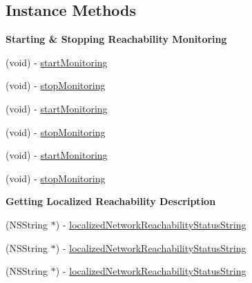 \subsection*{Instance Methods}
\begin{Indent}\textbf{ Starting \& Stopping Reachability Monitoring}\par
{\em 

 

 }\begin{DoxyCompactItemize}
\item 
(void) -\/ \mbox{\hyperlink{interface_a_f_network_reachability_manager_aa455bdcd0711021421aef6e2f87f62d7}{start\+Monitoring}}
\item 
(void) -\/ \mbox{\hyperlink{interface_a_f_network_reachability_manager_a3494d1eb9e2537cbd828e3632fc8e6ca}{stop\+Monitoring}}
\item 
(void) -\/ \mbox{\hyperlink{interface_a_f_network_reachability_manager_aa455bdcd0711021421aef6e2f87f62d7}{start\+Monitoring}}
\item 
(void) -\/ \mbox{\hyperlink{interface_a_f_network_reachability_manager_a3494d1eb9e2537cbd828e3632fc8e6ca}{stop\+Monitoring}}
\item 
(void) -\/ \mbox{\hyperlink{interface_a_f_network_reachability_manager_aa455bdcd0711021421aef6e2f87f62d7}{start\+Monitoring}}
\item 
(void) -\/ \mbox{\hyperlink{interface_a_f_network_reachability_manager_a3494d1eb9e2537cbd828e3632fc8e6ca}{stop\+Monitoring}}
\end{DoxyCompactItemize}
\end{Indent}
\begin{Indent}\textbf{ Getting Localized Reachability Description}\par
{\em 

 

 }\begin{DoxyCompactItemize}
\item 
(N\+S\+String $\ast$) -\/ \mbox{\hyperlink{interface_a_f_network_reachability_manager_afe6a32b5ab75661a802e6bbefaa74e2d}{localized\+Network\+Reachability\+Status\+String}}
\item 
(N\+S\+String $\ast$) -\/ \mbox{\hyperlink{interface_a_f_network_reachability_manager_afe6a32b5ab75661a802e6bbefaa74e2d}{localized\+Network\+Reachability\+Status\+String}}
\item 
(N\+S\+String $\ast$) -\/ \mbox{\hyperlink{interface_a_f_network_reachability_manager_afe6a32b5ab75661a802e6bbefaa74e2d}{localized\+Network\+Reachability\+Status\+String}}
\end{DoxyCompactItemize}
\end{Indent}
